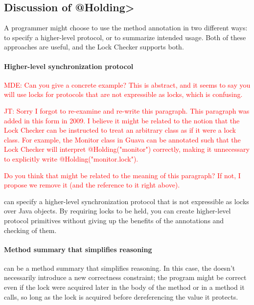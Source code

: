 \subsection{Discussion of \<@Holding>\label{lock-checker-holding}}

A programmer might choose to use the  method annotation in
two different ways:  to specify a higher-level protocol, or to summarize
intended usage.  Both of these approaches are useful, and the Lock Checker
supports both.

\paragraph{Higher-level synchronization protocol\label{lock-checker-holding-highlevel}}

\textcolor{red}{MDE: Can you give a concrete example? This is abstract, and it seems
to say you will use locks for protocols that are not expressible as locks, which is confusing.}

\textcolor{red}{JT: Sorry I forgot to re-examine and re-write this paragraph. This paragraph
was added in this form in 2009. I believe it might be related to the notion that the Lock
Checker can be instructed to treat an arbitrary class as if it were a lock class. For example,
the Monitor class in Guava can be annotated such that the Lock Checker will interpret
@Holding("monitor") correctly, making it unnecessary to explicitly write @Holding("monitor.lock").}

\textcolor{red}{Do you think that might be related to the meaning of this paragraph? If not, I propose we remove
it (and the reference to it right above).}

   can specify a higher-level synchronization protocol that
  is not expressible as locks over Java objects.  By requiring locks to be
  held, you can create higher-level protocol primitives without giving up
  the benefits of the annotations and checking of them.

\paragraph{Method summary that simplifies reasoning\label{lock-checker-holding-method-summary}}

   can be a method summary that simplifies reasoning.  In
  this case, the  doesn't necessarily introduce a new
  correctness constraint; the program might be correct even if the lock
  were acquired later in the body of the method or in a method it calls, so
  long as the lock is acquired before dereferencing the value it protects.

